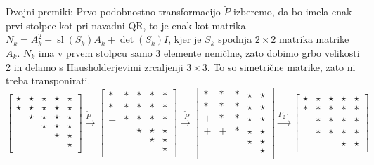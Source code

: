 \documentclass[a4paper,10pt]{article}
\theoremstyle{definition}
\DeclareMathOperator{\tr}{sl}
\begin{document}
Dvojni premiki: Prvo podobnostno transformacijo $\tilde{P}$ izberemo, da bo imela enak prvi
stolpec kot pri navadni QR, to je enak kot matrika $N_k = A_k^2 - \tr(S_k)A_k +
\det(S_k)I$, kjer je $S_k$ spodnja $2\times 2$ matrika matrike $A_k$. $N_k$ ima
v prvem stolpcu samo 3 elemente neničlne, zato dobimo grbo velikosti 2 in delamo
s Hausholderjevimi zrcaljenji $3\times 3$. To so simetrične matrike, zato ni
treba transponirati.
\[
\begin{bmatrix}
  \star & \star & \star & \star & \star \\
  \star & \star & \star & \star & \star \\
        & \star & \star & \star & \star \\
        &       & \star & \star & \star \\
        &       &       & \star & \star \\
        &       &       &       & \star \\
\end{bmatrix}
\xrightarrow{\tilde{P}\cdot}
\begin{bmatrix}
  * & * & *     & *     & * \\
  * & * & *     & *     & * \\
  + & * & *     & *     & * \\
    &   & \star & \star & \star \\
    &   &       & \star & \star \\
    &   &       &       & \star \\
\end{bmatrix}
\xrightarrow{\cdot \tilde{P}}
\begin{bmatrix}
  * & * & * & \star & \star \\
  * & * & * & \star & \star \\
  + & * & * & \star & \star \\
  + & + & * & \star & \star \\
    &   &   & \star & \star \\
    &   &   &       & \star \\
\end{bmatrix}
\xrightarrow{P_2\cdot}
\begin{bmatrix}
  \star & \star & \star & \star & \star \\
  *     & *     & *     & *     & * \\
        & *     & *     & *     & * \\
        & *     & *     & *     & * \\
        &       &       & \star & \star \\

\end{bmatrix}\]
\end{document}
